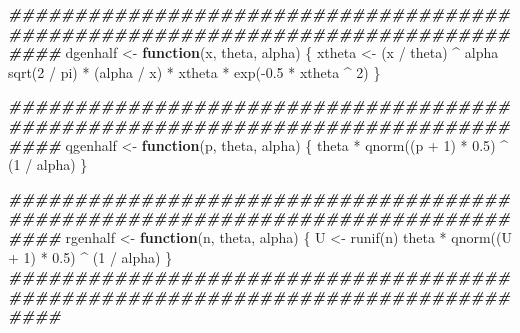 \documentclass[
]{article}
\newenvironment{Shaded}{\begin{snugshade}}{\end{snugshade}}
\newcommand{\ControlFlowTok}[1]{\textcolor[rgb]{0.13,0.29,0.53}{\textbf{#1}}}
\newcommand{\DecValTok}[1]{\textcolor[rgb]{0.00,0.00,0.81}{#1}}
\newcommand{\DocumentationTok}[1]{\textcolor[rgb]{0.56,0.35,0.01}{\textbf{\textit{#1}}}}
\newcommand{\FloatTok}[1]{\textcolor[rgb]{0.00,0.00,0.81}{#1}}
\newcommand{\FunctionTok}[1]{\textcolor[rgb]{0.00,0.00,0.00}{#1}}
\newcommand{\NormalTok}[1]{#1}
\newcommand{\OtherTok}[1]{\textcolor[rgb]{0.56,0.35,0.01}{#1}}
\newcommand{\SpecialCharTok}[1]{\textcolor[rgb]{0.00,0.00,0.00}{#1}}
\begin{document}
\begin{Shaded}
\begin{Highlighting}[]
\DocumentationTok{\#\#\#\#\#\#\#\#\#\#\#\#\#\#\#\#\#\#\#\#\#\#\#\#\#\#\#\#\#\#\#\#\#\#\#\#\#\#\#\#\#\#\#\#\#\#\#\#\#\#\#\#\#\#\#\#\#\#\#\#\#\#\#\#\#\#\#\#\#\#\#\#\#\#\#\#\#\#\#\#}
\NormalTok{dgenhalf }\OtherTok{\textless{}{-}} \ControlFlowTok{function}\NormalTok{(x, theta, alpha)}
\NormalTok{\{}
\NormalTok{  xtheta }\OtherTok{\textless{}{-}}\NormalTok{ (x }\SpecialCharTok{/}\NormalTok{ theta) }\SpecialCharTok{\^{}}\NormalTok{ alpha}
  \FunctionTok{sqrt}\NormalTok{(}\DecValTok{2} \SpecialCharTok{/}\NormalTok{ pi) }\SpecialCharTok{*}\NormalTok{ (alpha }\SpecialCharTok{/}\NormalTok{ x) }\SpecialCharTok{*}\NormalTok{ xtheta  }\SpecialCharTok{*} \FunctionTok{exp}\NormalTok{(}\SpecialCharTok{{-}}\FloatTok{0.5} \SpecialCharTok{*}\NormalTok{ xtheta }\SpecialCharTok{\^{}} \DecValTok{2}\NormalTok{)}
\NormalTok{\}}
\end{Highlighting}
\end{Shaded}

\begin{Shaded}
\begin{Highlighting}[]
\DocumentationTok{\#\#\#\#\#\#\#\#\#\#\#\#\#\#\#\#\#\#\#\#\#\#\#\#\#\#\#\#\#\#\#\#\#\#\#\#\#\#\#\#\#\#\#\#\#\#\#\#\#\#\#\#\#\#\#\#\#\#\#\#\#\#\#\#\#\#\#\#\#\#\#\#\#\#\#\#\#\#\#\#}
\NormalTok{qgenhalf }\OtherTok{\textless{}{-}} \ControlFlowTok{function}\NormalTok{(p, theta, alpha)}
\NormalTok{\{}
\NormalTok{  theta }\SpecialCharTok{*} \FunctionTok{qnorm}\NormalTok{((p }\SpecialCharTok{+} \DecValTok{1}\NormalTok{) }\SpecialCharTok{*} \FloatTok{0.5}\NormalTok{) }\SpecialCharTok{\^{}}\NormalTok{ (}\DecValTok{1} \SpecialCharTok{/}\NormalTok{ alpha)}
\NormalTok{\}}
\end{Highlighting}
\end{Shaded}

\begin{Shaded}
\begin{Highlighting}[]
\DocumentationTok{\#\#\#\#\#\#\#\#\#\#\#\#\#\#\#\#\#\#\#\#\#\#\#\#\#\#\#\#\#\#\#\#\#\#\#\#\#\#\#\#\#\#\#\#\#\#\#\#\#\#\#\#\#\#\#\#\#\#\#\#\#\#\#\#\#\#\#\#\#\#\#\#\#\#\#\#\#\#\#\#}
\NormalTok{rgenhalf }\OtherTok{\textless{}{-}} \ControlFlowTok{function}\NormalTok{(n, theta, alpha)}
\NormalTok{\{}
\NormalTok{  U }\OtherTok{\textless{}{-}} \FunctionTok{runif}\NormalTok{(n)}
\NormalTok{  theta }\SpecialCharTok{*} \FunctionTok{qnorm}\NormalTok{((U }\SpecialCharTok{+} \DecValTok{1}\NormalTok{) }\SpecialCharTok{*} \FloatTok{0.5}\NormalTok{) }\SpecialCharTok{\^{}}\NormalTok{ (}\DecValTok{1} \SpecialCharTok{/}\NormalTok{ alpha)}
\NormalTok{\}}
\DocumentationTok{\#\#\#\#\#\#\#\#\#\#\#\#\#\#\#\#\#\#\#\#\#\#\#\#\#\#\#\#\#\#\#\#\#\#\#\#\#\#\#\#\#\#\#\#\#\#\#\#\#\#\#\#\#\#\#\#\#\#\#\#\#\#\#\#\#\#\#\#\#\#\#\#\#\#\#\#\#\#\#\#}
\end{Highlighting}
\end{Shaded}
\end{document}
